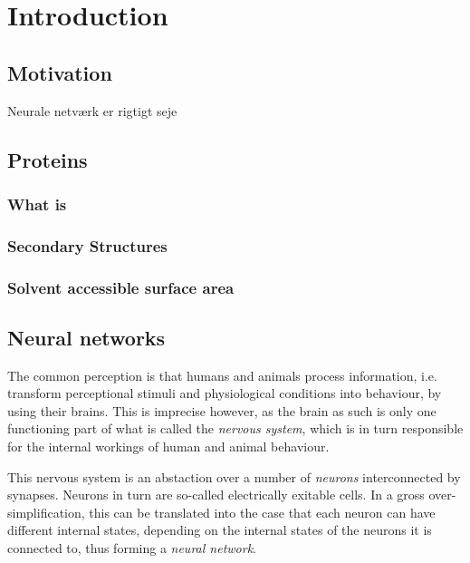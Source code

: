 \section{Introduction}
\subsection{Motivation}
Neurale netværk er rigtigt seje \cite{bishop2006}
\subsection{Proteins}
\subsubsection{What is}
\subsubsection{Secondary Structures}
\subsubsection{Solvent accessible surface area}
\subsection{Neural networks}
The common perception is that humans and animals process information, i.e. transform perceptional 
stimuli and physiological conditions into behaviour, by using their brains. This is imprecise 
however, as the brain as such is only one functioning part of what is called the \textit{nervous 
system}, which is in turn responsible for the internal workings of human and animal behaviour.

This nervous system is an abstaction over a number of \textit{neurons} interconnected by 
synapses. Neurons in turn are so-called electrically exitable cells. In a gross over-simplification, this can be translated into the case that each neuron can have different internal states, depending on the internal states of the neurons it is connected to, thus forming a \textit{neural network}.


